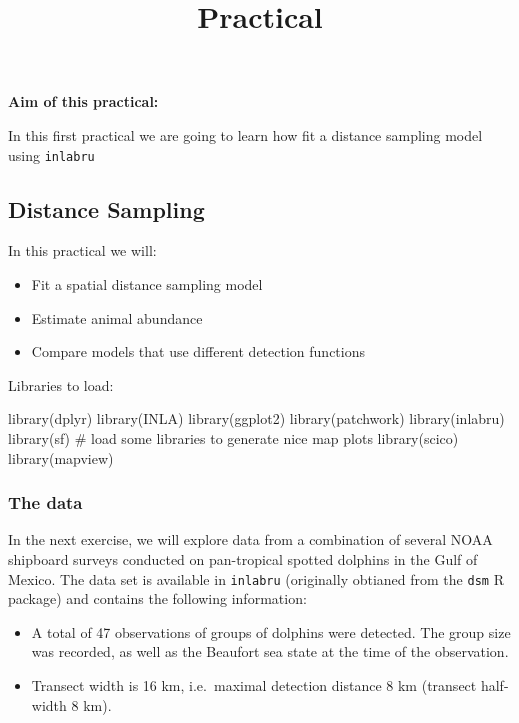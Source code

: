 \documentclass[
  letterpaper,
  DIV=11,
  numbers=noendperiod]{scrartcl}
\title{Practical}
\author{}
\date{}
\makeatletter
\newenvironment{Shaded}{\begin{snugshade}}{\end{snugshade}}
\newcommand{\CommentTok}[1]{\textcolor[rgb]{0.37,0.37,0.37}{#1}}
\newcommand{\FunctionTok}[1]{\textcolor[rgb]{0.28,0.35,0.67}{#1}}
\newcommand{\NormalTok}[1]{\textcolor[rgb]{0.00,0.23,0.31}{#1}}
\providecommand{\tightlist}{%
  \setlength{\itemsep}{0pt}\setlength{\parskip}{0pt}}\usepackage{longtable,booktabs,array}
\renewcommand{\maketitle}{\bgroup\setlength{\parindent}{0pt}
\begin{flushleft}
  {\sffamily\huge\textbf{\MakeUppercase{\@title}}} \vspace{0.3cm} \newline
  {\Large {\@subtitle}} \newline
  \@author
\end{flushleft}\egroup
}
\makeatother
\begin{document}
\maketitle

\pagestyle{mystyle}


\textbf{Aim of this practical:}

In this first practical we are going to learn how fit a distance
sampling model using \texttt{inlabru}

\subsection{Distance Sampling}\label{distance-sampling}

In this practical we will:

\begin{itemize}
\tightlist
\item
  Fit a spatial distance sampling model
\item
  Estimate animal abundance
\item
  Compare models that use different detection functions
\end{itemize}

Libraries to load:

\begin{Shaded}
\begin{Highlighting}[]
\FunctionTok{library}\NormalTok{(dplyr)}
\FunctionTok{library}\NormalTok{(INLA)}
\FunctionTok{library}\NormalTok{(ggplot2)}
\FunctionTok{library}\NormalTok{(patchwork)}
\FunctionTok{library}\NormalTok{(inlabru)     }
\FunctionTok{library}\NormalTok{(sf)}
\CommentTok{\# load some libraries to generate nice map plots}
\FunctionTok{library}\NormalTok{(scico)}
\FunctionTok{library}\NormalTok{(mapview)}
\end{Highlighting}
\end{Shaded}

\subsubsection{The data}\label{the-data}

In the next exercise, we will explore data from a combination of several
NOAA shipboard surveys conducted on pan-tropical spotted dolphins in the
Gulf of Mexico. The data set is available in \texttt{inlabru}
(originally obtianed from the \texttt{dsm} R package) and contains the
following information:

\begin{itemize}
\item
  A total of 47 observations of groups of dolphins were detected. The
  group size was recorded, as well as the Beaufort sea state at the time
  of the observation.
\item
  Transect width is 16 km, i.e.~maximal detection distance 8 km
  (transect half-width 8 km).
\end{itemize}
\end{document}
